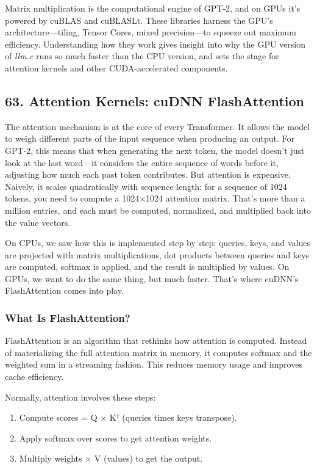 \documentclass[
  letterpaper,
  DIV=11,
  numbers=noendperiod]{scrreprt}
\providecommand{\tightlist}{%
  \setlength{\itemsep}{0pt}\setlength{\parskip}{0pt}}
\begin{document}
Matrix multiplication is the computational engine of GPT-2, and on GPUs
it's powered by cuBLAS and cuBLASLt. These libraries harness the GPU's
architecture---tiling, Tensor Cores, mixed precision---to squeeze out
maximum efficiency. Understanding how they work gives insight into why
the GPU version of \emph{llm.c} runs so much faster than the CPU
version, and sets the stage for attention kernels and other
CUDA-accelerated components.

\subsection{63. Attention Kernels: cuDNN
FlashAttention}\label{attention-kernels-cudnn-flashattention}

The attention mechanism is at the core of every Transformer. It allows
the model to weigh different parts of the input sequence when producing
an output. For GPT-2, this means that when generating the next token,
the model doesn't just look at the last word---it considers the entire
sequence of words before it, adjusting how much each past token
contributes. But attention is expensive. Naively, it scales
quadratically with sequence length: for a sequence of 1024 tokens, you
need to compute a 1024×1024 attention matrix. That's more than a million
entries, and each must be computed, normalized, and multiplied back into
the value vectors.

On CPUs, we saw how this is implemented step by step: queries, keys, and
values are projected with matrix multiplications, dot products between
queries and keys are computed, softmax is applied, and the result is
multiplied by values. On GPUs, we want to do the same thing, but much
faster. That's where cuDNN's FlashAttention comes into play.

\subsubsection{What Is FlashAttention?}\label{what-is-flashattention}

FlashAttention is an algorithm that rethinks how attention is computed.
Instead of materializing the full attention matrix in memory, it
computes softmax and the weighted sum in a streaming fashion. This
reduces memory usage and improves cache efficiency.

Normally, attention involves these steps:

\begin{enumerate}
\def\labelenumi{\arabic{enumi}.}
\tightlist
\item
  Compute scores = Q × Kᵀ (queries times keys transpose).
\item
  Apply softmax over scores to get attention weights.
\item
  Multiply weights × V (values) to get the output.
\end{enumerate}
\end{document}
